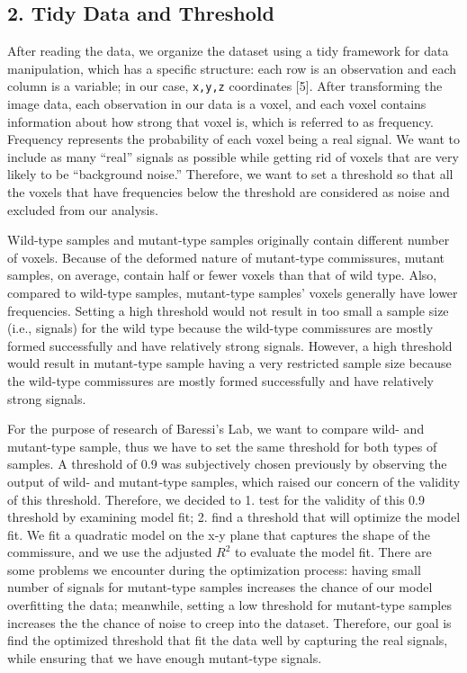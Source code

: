 \documentclass[10pt,letterpaper]{article}
\begin{document}
\hypertarget{tidy-data-and-threshold}{%
\subsection{2. Tidy Data and Threshold}\label{tidy-data-and-threshold}}

After reading the data, we organize the dataset using a tidy framework
for data manipulation, which has a specific structure: each row is an
observation and each column is a variable; in our case, \texttt{x,y,z}
coordinates {[}5{]}. After transforming the image data, each observation
in our data is a voxel, and each voxel contains information about how
strong that voxel is, which is referred to as frequency. Frequency
represents the probability of each voxel being a real signal. We want to
include as many ``real'' signals as possible while getting rid of voxels
that are very likely to be ``background noise.'' Therefore, we want to
set a threshold so that all the voxels that have frequencies below the
threshold are considered as noise and excluded from our analysis.

Wild-type samples and mutant-type samples originally contain different
number of voxels. Because of the deformed nature of mutant-type
commissures, mutant samples, on average, contain half or fewer voxels
than that of wild type. Also, compared to wild-type samples, mutant-type
samples' voxels generally have lower frequencies. Setting a high
threshold would not result in too small a sample size (i.e., signals)
for the wild type because the wild-type commissures are mostly formed
successfully and have relatively strong signals. However, a high
threshold would result in mutant-type sample having a very restricted
sample size because the wild-type commissures are mostly formed
successfully and have relatively strong signals.

For the purpose of research of Baressi's Lab, we want to compare wild-
and mutant-type sample, thus we have to set the same threshold for both
types of samples. A threshold of 0.9 was subjectively chosen previously
by observing the output of wild- and mutant-type samples, which raised
our concern of the validity of this threshold. Therefore, we decided to
1. test for the validity of this 0.9 threshold by examining model fit;
2. find a threshold that will optimize the model fit. We fit a quadratic
model on the x-y plane that captures the shape of the commissure, and we
use the adjusted \(R^2\) to evaluate the model fit. There are some
problems we encounter during the optimization process: having small
number of signals for mutant-type samples increases the chance of our
model overfitting the data; meanwhile, setting a low threshold for
mutant-type samples increases the the chance of noise to creep into the
dataset. Therefore, our goal is find the optimized threshold that fit
the data well by capturing the real signals, while ensuring that we have
enough mutant-type signals.
\end{document}
